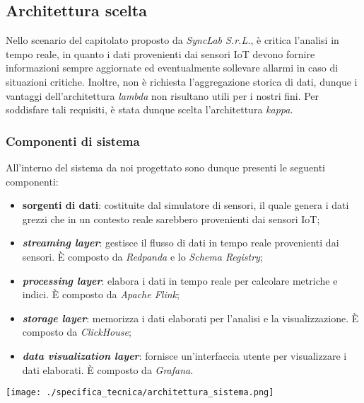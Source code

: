 \subsection{Architettura scelta}
Nello scenario del capitolato proposto da \textit{SyncLab S.r.L.}, è critica l'analisi in tempo reale, in quanto i dati provenienti dai sensori IoT devono fornire informazioni sempre aggiornate ed eventualmente
sollevare allarmi in caso di situazioni critiche. Inoltre, non è richiesta l'aggregazione storica di dati, dunque i vantaggi dell'architettura \textit{lambda} non risultano utili per i nostri fini.
Per soddisfare tali requisiti, è stata dunque scelta l'architettura \textit{kappa}.

\subsubsection{Componenti di sistema}
All'interno del sistema da noi progettato sono dunque presenti le seguenti componenti:
\begin{itemize}
	\item \textbf{sorgenti di dati}: costituite dal simulatore di sensori, il quale genera i dati grezzi che in un contesto reale sarebbero provenienti dai sensori IoT;
	\item \textbf{\textit{streaming layer}}: gestisce il flusso di dati in tempo reale provenienti dai sensori. È composto da \textit{Redpanda} e lo \textit{Schema Registry};
	\item \textbf{\textit{processing layer}}: elabora i dati in tempo reale per calcolare metriche e indici. È composto da \textit{Apache Flink};
	\item \textbf{\textit{storage layer}}: memorizza i dati elaborati per l'analisi e la visualizzazione. È composto da \textit{ClickHouse};
	\item \textbf{\textit{data visualization layer}}: fornisce un'interfaccia utente per visualizzare i dati elaborati. È composto da \textit{Grafana}.
\end{itemize}

\begin{center}
	\texttt{[image: ./specifica\_tecnica/architettura\_sistema.png]}
\end{center}

